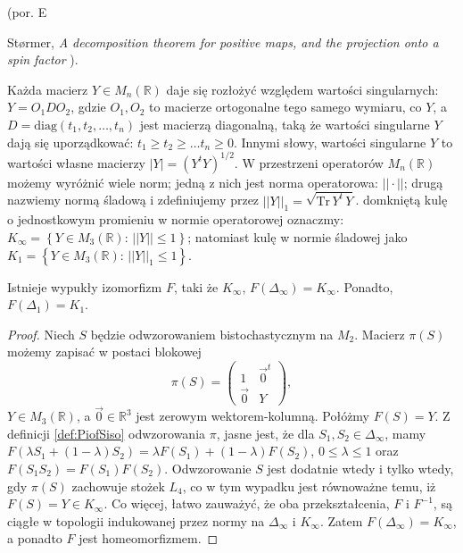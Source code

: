 (por. E\,{St{\o}rmer, \emph{A decomposition theorem for positive maps, and the projection onto a spin factor}
\cite{stormer2013decomposition}).

Każda macierz $Y \in M_{n}(\mathbb{R})$ daje się rozłożyć względem wartości singularnych:
$Y = O_{1} D O_{2}$, gdzie
$O_{1}, O_{2}$ to macierze ortogonalne tego samego wymiaru, co $Y$, a
$D = \text{diag}(t_{1}, t_{2}, \ldots, t_{n})$ jest macierzą diagonalną,
taką że wartości singularne $Y$ dają się uporządkować:
$t_{1} \geq t_{2} \geq \ldots t_{n} \geq 0$.
Innymi słowy, wartości singularne $Y$ to wartości własne macierzy
$|Y| = (Y^{t} Y)^{1/2}$.
W przestrzeni operatorów $M_{n}(\mathbb{R})$ możemy wyróżnić wiele norm;
jedną z nich jest norma operatorowa: $|| \cdot ||$;
drugą nazwiemy normą śladową i zdefiniujemy przez
$||Y||_{1} = \sqrt{\text{Tr} \, Y^{t} \, Y }$.
domkniętą kulę o jednostkowym promieniu w normie operatorowej oznaczmy:
$K_{\infty} = \left \{ Y \in M_{3}(\mathbb{R}): \, ||Y|| \leq 1 \right \}$;
natomiast kulę w normie śladowej jako
$K_{1} = \left \{ Y \in M_{3}(\mathbb{R}): \, ||Y||_{1} \leq 1 \right \}$.

\begin{Theorem}
\label{thm:Ball}
Istnieje wypukły izomorfizm $F$, taki że $K_{\infty}$, $F(\Delta_{\infty}) = K_{\infty}$.
Ponadto, $F(\Delta_{1}) = K_{1}$.
\end{Theorem}
\begin{proof}
Niech $S$ będzie odwzorowaniem bistochastycznym na $M_{2}$.
Macierz $\pi(S)$ możemy zapisać w postaci blokowej
\begin{equation}
\label{eq:Sbistochastic}
\pi(S) = \begin{pmatrix}
    1  &  \vec{0}^{t} \\
    \vec{0} & Y
    \end{pmatrix},
\end{equation}
$Y \in M_{3}(\mathbb{R})$,
a $\vec{0} \in \mathbb{R}^{3}$ jest zerowym wektorem-kolumną.
Połóżmy $F(S) = Y$.
Z definicji \eqref{def:PiofSiso}
odwzorowania $\pi$,
jasne jest, że dla  $S_{1}, S_{2} \in \Delta_{\infty}$,
mamy $F \left( \lambda S_{1} + (1-\lambda) S_{2} \right) =
 \lambda F(S_{1}) + (1-\lambda) F(S_{2})$,
$0 \leq \lambda \leq 1$
oraz $F(S_{1} S_{2}) = F(S_{1}) F(S_{2})$.
Odwzorowanie $S$ jest dodatnie wtedy i tylko wtedy, gdy
$\pi(S)$ zachowuje stożek $L_{4}$,
co w tym wypadku jest równoważne temu, iż $F(S) = Y \in K_{\infty}$.
Co więcej, łatwo zauważyć, że oba przekształcenia, $F$ i $F^{-1}$,
są ciągłe w topologii indukowanej przez normy na
$\Delta_{\infty}$ i $K_{\infty}$.
Zatem $F(\Delta_{\infty}) = K_{\infty}$, a ponadto $F$ jest homeomorfizmem.


\end{proof}}
